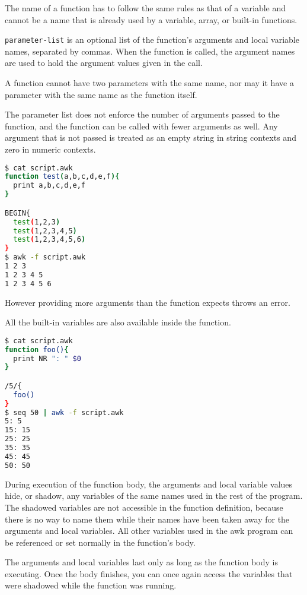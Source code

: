The name of a function has to follow the same rules as that of a variable and cannot be a name that is already used by a variable, array, or built-in functions.

\lstinline|parameter-list| is an optional list of the function’s arguments and local variable names, separated by commas. When the function is called, the argument names are used to hold the argument values given in the call.

A function cannot have two parameters with the same name, nor may it have a parameter with the same name as the function itself.

The parameter list does not enforce the number of arguments passed to the function, and the function can be called with fewer arguments as well.
Any argument that is not passed is treated as an empty string in string contexts and zero in numeric contexts.

\begin{lstlisting}[language=bash]
$ cat script.awk
function test(a,b,c,d,e,f){
  print a,b,c,d,e,f
}

BEGIN{
  test(1,2,3)
  test(1,2,3,4,5)
  test(1,2,3,4,5,6)
}
$ awk -f script.awk
1 2 3
1 2 3 4 5
1 2 3 4 5 6
\end{lstlisting}

However providing more arguments than the function expects throws an error.

All the built-in variables are also available inside the function.

\begin{lstlisting}[language=bash]
$ cat script.awk
function foo(){
  print NR ": " $0
}

/5/{
  foo()
}
$ seq 50 | awk -f script.awk
5: 5
15: 15
25: 25
35: 35
45: 45
50: 50
\end{lstlisting}

During execution of the function body, the arguments and local variable values hide, or shadow, any variables of the same names used in the rest of the program. The shadowed variables are not accessible in the function definition, because there is no way to name them while their names have been taken away for the arguments and local variables. All other variables used in the awk program can be referenced or set normally in the function’s body.

The arguments and local variables last only as long as the function body is executing. Once the body finishes, you can once again access the variables that were shadowed while the function was running.

